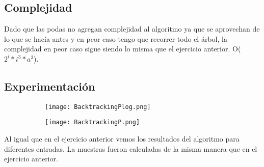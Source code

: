 \subsection{Complejidad}

	Dado que las podas no agregan complejidad al algoritmo ya que se aprovechan de lo que se hacía antes y en peor caso tengo que recorrer todo el árbol, la complejidad en peor caso sigue siendo lo misma que el ejercicio anterior. O($2^{i}*i^{3}*a^{3}$). 
	
\subsection{Experimentación}

\begin{figure}[h]

\begin{subfigure}{0.5\textwidth}
\texttt{[image: BacktrackingPlog.png]}
\end{subfigure}
\begin{subfigure}{0.5\textwidth}
\texttt{[image: BacktrackingP.png]}
\end{subfigure}

\end{figure}

	Al igual que en el ejercicio anterior vemos los resultados del algoritmo para diferentes entradas. La muestras fueron calculadas de la misma manera que en el ejercicio anterior.